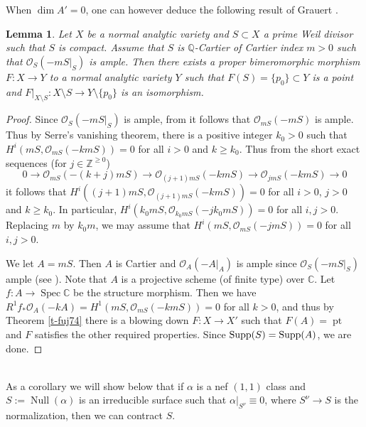 \documentclass[12pt]{amsart}
\theoremstyle{plain}
\newtheorem{lemma}[theorem]{Lemma}
\theoremstyle{remark}
\theoremstyle{definition}
\def\Null{\operatorname{Null}}
\newcommand{\<}{\leq}
\def\>{\geq}
\def\mcO{\mathcal{O}}
\newcommand{\num}{\equiv}
\newcommand{\OO}{{\mathcal{O}}}
\newcommand{\Q}{{\mathbb{Q}}}
\newcommand{\Supp}{{\rm Supp}}
\newcommand{\mbC}{\mathbb{C}}
\newcommand{\mbZ}{\mathbb{Z}}
\def\>{\geq}
\def\mcO{\mathcal{O}}
\def\pt{\operatorname{pt}}
\def\dim{\operatorname{dim}}
\def\Spec{\operatorname{Spec}}
\theoremstyle{definition}
\theoremstyle{definition}
\numberwithin{equation}{section}
\theoremstyle{remark}
\begin{document}
When $\dim A'=0$, one can however deduce the following result of Grauert \cite{Gra62}.
\begin{lemma}\label{l-cont}
Let $X$ be a normal analytic variety and $S\subset X$ a prime Weil divisor such that $S$ is compact.  Assume that $S$ is $\Q$-Cartier of Cartier index $m>0$ such that $\mcO_S(-mS|_S)$ is ample. Then there exists a proper bimeromorphic morphism $F:X\to Y$ to a normal analytic variety $Y$ such that $F(S)=\{p_0\}\subset Y$ is a point and $F|_{X\setminus S}:X\setminus S\to Y\setminus \{p_0\}$ is an isomorphism. 
\end{lemma}
\begin{proof}
Since $\mcO_S(-mS|_S)$ is ample, from \cite[Proposition 1.2.16(i)]{Laz04a} it follows that  $\mcO_{mS}(-mS)$ is ample. Thus by Serre's vanishing theorem, there is a positive integer $k_0>0$ such that $H^i(mS, \OO _{mS}(-kmS))=0$ for all $i>0$ and $k\geq k_0$.
     Thus from the short exact sequences (for $j\in \mbZ^{\>0}$)
    \[0\to \OO _{mS}(-(k+j)mS)\to \OO _{(j+1)mS}(-kmS)\to \OO _{jmS}(-kmS) \to 0\]
    it follows that $H^i((j+1)mS, \OO _{(j+1)mS}(-kmS))=0$ for all $i>0$, $j> 0$ and $k\geq k_0$.
    In particular, $H^i(k_0mS, \OO _{k_0mS}(-jk_0mS))=0$ for all $i,j>0$.
    Replacing $m$ by $k_0m$, we may assume that $H^i(mS, \OO _{mS}(-jmS))=0$ for all $i,j>0$.
   
    
    We let $A=mS$. Then $A$ is Cartier and $\mcO_A(-A|_A)$ is ample since $\mcO_S(-mS|_S)$ ample (see \cite[Proposition 1.2.16(i)]{Laz04a}). Note that $A$ is a projective scheme (of finite type) over $\mbC$. Let $f:A\to \Spec \mbC$ be the structure morphism. Then we have $R^1f_*\OO _A(-kA)=H^1(mS, \OO _{mS}(-kmS))=0$ for all $k>0$, and thus by Theorem \ref{t-fuj74} there is a blowing down $F:X\to X'$ such that $F(A)=\pt$ and $F$ satisfies the other required properties. Since $\Supp(S)=\Supp (A)$, we are done.
    
   
   
\end{proof}~\\

As a corollary we will show below that if $\alpha$ is a nef $(1,1)$ class and $S:=\Null(\alpha)$ is an irreducible surface such that $\alpha|_{S^\nu}\num 0$, where $S^\nu\to S$ is the normalization, then we can contract $S$. 
\end{document}
